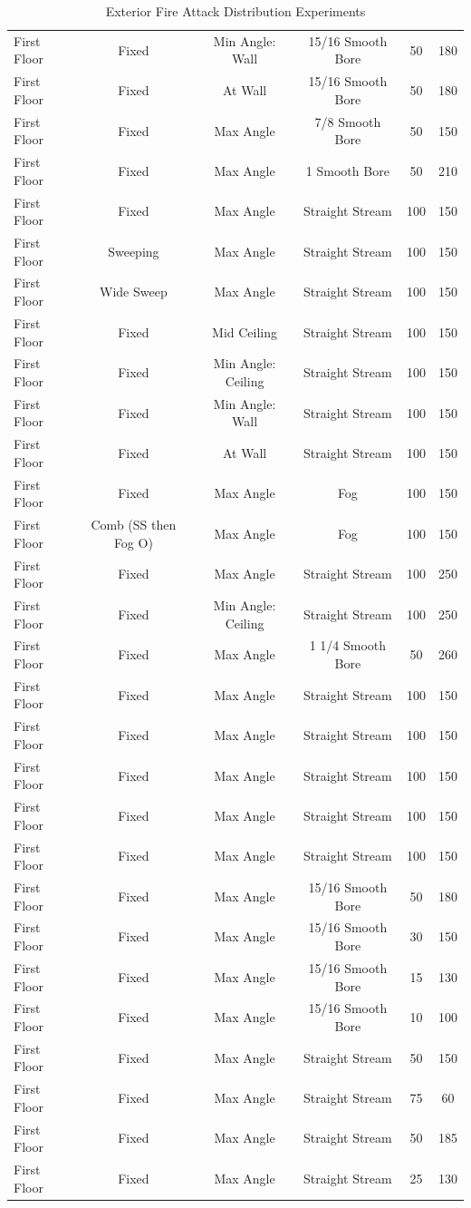 \documentclass{article}
\begin{document}
\begin{table}[]
{\begin{tabular}{|lccccc|}
First Floor & Fixed & Min Angle: Wall & 15/16 Smooth Bore & 50 & 180 \\
First Floor & Fixed & At Wall & 15/16 Smooth Bore & 50 & 180 \\
First Floor & Fixed & Max Angle & 7/8 Smooth Bore & 50 & 150 \\
First Floor & Fixed & Max Angle & 1 Smooth Bore & 50 & 210 \\
First Floor & Fixed & Max Angle & Straight Stream & 100 & 150 \\
First Floor & Sweeping & Max Angle & Straight Stream & 100 & 150 \\
First Floor & Wide Sweep & Max Angle & Straight Stream & 100 & 150 \\
First Floor & Fixed & Mid Ceiling & Straight Stream & 100 & 150 \\
First Floor & Fixed & Min Angle: Ceiling & Straight Stream & 100 & 150 \\
First Floor & Fixed & Min Angle: Wall & Straight Stream & 100 & 150 \\
First Floor & Fixed & At Wall & Straight Stream & 100 & 150 \\
First Floor & Fixed & Max Angle & Fog & 100 & 150 \\
First Floor & Comb (SS then Fog O) & Max Angle & Fog & 100 & 150 \\
First Floor & Fixed & Max Angle & Straight Stream & 100 & 250 \\
First Floor & Fixed & Min Angle: Ceiling & Straight Stream & 100 & 250 \\
First Floor & Fixed & Max Angle & 1 1/4 Smooth Bore & 50 & 260 \\
First Floor & Fixed & Max Angle & Straight Stream & 100 & 150 \\
First Floor & Fixed & Max Angle & Straight Stream & 100 & 150 \\
First Floor & Fixed & Max Angle & Straight Stream & 100 & 150 \\
First Floor & Fixed & Max Angle & Straight Stream & 100 & 150 \\
First Floor & Fixed & Max Angle & Straight Stream & 100 & 150 \\
First Floor & Fixed & Max Angle & 15/16 Smooth Bore & 50 & 180 \\
First Floor & Fixed & Max Angle & 15/16 Smooth Bore & 30 & 150 \\
First Floor & Fixed & Max Angle & 15/16 Smooth Bore & 15 & 130 \\
First Floor & Fixed & Max Angle & 15/16 Smooth Bore & 10 & 100 \\
First Floor & Fixed & Max Angle & Straight Stream & 50 & 150 \\
First Floor & Fixed & Max Angle & Straight Stream & 75 & 60 \\
First Floor & Fixed & Max Angle & Straight Stream & 50 & 185 \\
First Floor & Fixed & Max Angle & Straight Stream & 25 & 130 \\ \hline
\end{tabular}}
\caption{Exterior Fire Attack Distribution Experiments}
\label{Exterior_Fire_Attack_Distribution_Experiments}
\end{table}
\end{document}
